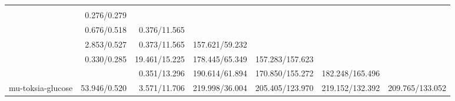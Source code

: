 \begin{tabular}{lrrrrr}
\toprule
{} &         &          &           &            &            &            \\
\midrule
{}            &               &                &                 &                  &                  &                  \\
            &   0.276/0.279 &                &                 &                  &                  &                  \\
            &   0.676/0.518 &   0.376/11.565 &                 &                  &                  &                  \\
            &   2.853/0.527 &   0.373/11.565 &  157.621/59.232 &                  &                  &                  \\
            &   0.330/0.285 &  19.461/15.225 &  178.445/65.349 &  157.283/157.623 &                  &                  \\
            &               &   0.351/13.296 &  190.614/61.894 &  170.850/155.272 &  182.248/165.496 &                  \\
mu-toksia-glucose &  53.946/0.520 &   3.571/11.706 &  219.998/36.004 &  205.405/123.970 &  219.152/132.392 &  209.765/133.052 \\
\bottomrule
\end{tabular}
